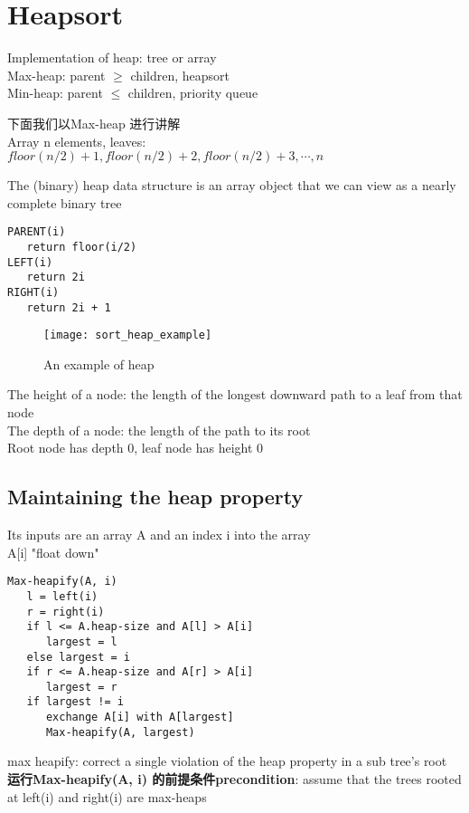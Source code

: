 \documentclass{article}
\begin{document}
\section{Heapsort}
Implementation of heap: tree or array\\
Max-heap: parent $\geq$ children,
	heapsort\\
Min-heap: parent $\leq$ children,
	priority queue

下面我们以Max-heap 进行讲解\\
Array n elements, leaves: $floor(n/2) + 1, floor(n/2) + 2, floor(n/2) + 3, \cdots, n$

The (binary) heap data structure is an array object that we can view as a nearly complete binary tree
\begin{verbatim}
PARENT(i)
   return floor(i/2)
LEFT(i)
   return 2i
RIGHT(i)
   return 2i + 1
\end{verbatim}

\begin{figure}[htbp]
  \centering
  \texttt{[image: sort\_heap\_example]}
  \caption{An example of heap}\label{fig.sort.heap.example}
\end{figure}

The height of a node: the length of the longest downward path to a leaf from that node\\
The depth of a node: the length of the path to its root\\
Root node has depth 0, leaf node has height 0

\subsection{Maintaining the heap property}
Its inputs are an array A and an index i into the array\\
A[i] "float down"

\begin{verbatim}
Max-heapify(A, i)
   l = left(i)
   r = right(i)
   if l <= A.heap-size and A[l] > A[i]
      largest = l
   else largest = i
   if r <= A.heap-size and A[r] > A[i]
      largest = r
   if largest != i
      exchange A[i] with A[largest]
      Max-heapify(A, largest)
\end{verbatim}

max heapify: correct a single violation of the heap property in a sub tree's root\\
\textbf{运行Max-heapify(A, i) 的前提条件precondition}: assume that the trees rooted at left(i) and right(i) are max-heaps
\end{document}
